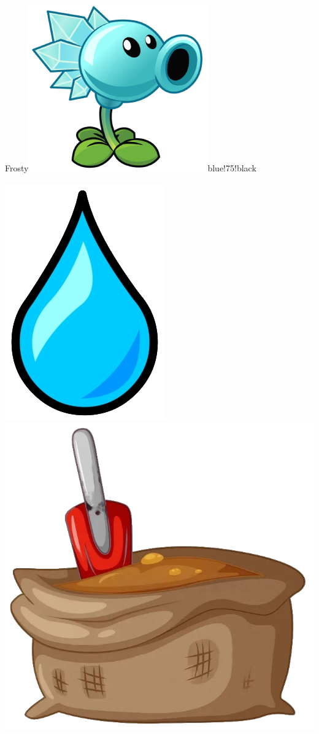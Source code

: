 \documentclass[11pt, a5paper]{article}
\def\now{\hspace{0.2cm}}
\begin{document}
\begin{mybox}{Frosty}{\includegraphics[scale=0.1]{frosty}}{blue!75!black}
\begin{minipage}[t]{\textwidth}
			\now\includegraphics[scale=0.3]{water} 
			\now\includegraphics[scale=0.04]{dirt} 

\end{minipage}
\end{mybox}
\end{document}
